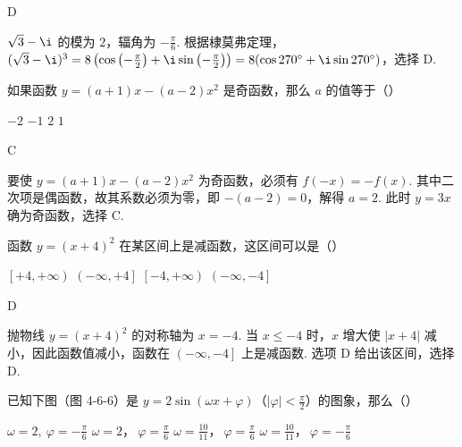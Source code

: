 \documentclass[UTF8,a4paper,oneside,11pt]{ctexbook}
\begin{document}
\begin{answer}
D
\end{answer}

\begin{solution}
\(\sqrt3-\i\) 的模为 \(2\)，辐角为 \(-\frac{\pi}{6}\). 根据棣莫弗定理，\((\sqrt3-\i)^3=8\left(\cos\left(-\frac{\pi}{2}\right)+\i\sin\left(-\frac{\pi}{2}\right)\right)=8(\cos270^{\circ}+\i\sin270^{\circ})\)，选择 D.
\end{solution}

\begin{problem}
如果函数 \(y=(a+1)x-(a-2)x^2\) 是奇函数，那么 \(a\) 的值等于（\quad）

\choices
    {\(-2\)}
    {\(-1\)}
    {\(2\)}
    {\(1\)}
\end{problem}

\begin{answer}
C
\end{answer}

\begin{solution}
要使 \(y=(a+1)x-(a-2)x^2\) 为奇函数，必须有 \(f(-x)=-f(x)\). 其中二次项是偶函数，故其系数必须为零，即 \(-(a-2)=0\)，解得 \(a=2\). 此时 \(y=3x\) 确为奇函数，选择 C.
\end{solution}

\begin{problem}
函数 \(y=(x+4)^2\) 在某区间上是减函数，这区间可以是（\quad）

\choices
    {\(\left[+4,+\infty\right)\)}
    {\(\left(-\infty,+4\right]\)}
    {\(\left[-4,+\infty\right)\)}
    {\(\left(-\infty,-4\right]\)}
\end{problem}

\begin{answer}
D
\end{answer}

\begin{solution}
抛物线 \(y=(x+4)^2\) 的对称轴为 \(x=-4\). 当 \(x\leqslant-4\) 时，\(x\) 增大使 \(|x+4|\) 减小，因此函数值减小，函数在 \(\left(-\infty,-4\right]\) 上是减函数. 选项 D 给出该区间，选择 D.
\end{solution}

\begin{problem}
已知下图（图 4-6-6）是 \(y=2\sin(\omega x+\varphi)\)（\(\left|\varphi\right|<\frac{\pi}{2}\)）的图象，那么（\quad）


\choices
    {\(\omega=2,\ \varphi=-\frac{\pi}{6}\)}
    {\(\omega=2\)，\(\ \varphi=\frac{\pi}{6}\)}
    {\(\omega=\frac{10}{11}\)，\(\ \varphi=\frac{\pi}{6}\)}
    {\(\omega=\frac{10}{11}\)，\(\ \varphi=-\frac{\pi}{6}\)}
\end{problem}
\end{document}
